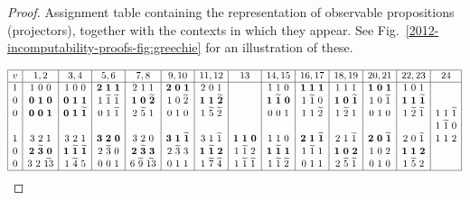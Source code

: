 \documentclass[%
 preprint,
 showpacs,
 showkeys,
 amsmath,
 amssymb,
 aps,
 pra,
 ]{revtex4-1}
\theoremstyle{definition}
\newcommand{\m}[1]{\widetilde{#1}}
\begin{document}
\begin{proof}
	
	\begin{table}
		\caption{Assignment table containing the representation of observable propositions (projectors), together with the contexts in which they appear.
			 See Fig.~\ref{2012-incomputability-proofs-fig:greechie} for an illustration of these.}
		\label{2012-incomputability-proofs-table:greechie}
		\small
		$$\begin{array}{|c|c|c|c|c|c|c|c|c|c|c|c|c|c|}
			\hline
			v & 1, 2        & 3, 4          & 5, 6      & 7, 8       & 9, 10      & 11, 12      & 13        & 14, 15      & 16, 17      & 18, 19      & 20, 21      & 22, 23      & 24      \\
			\hline
			1 & 1~0~0       & 1~0~0         & \bf 2~1~1 & 2~1~1        & \bf 2~0~1   & 2~0~1       &           & 1~1~0       & \bf 1~1~1   & 1~1~1       & \bf 1~0~1   & 1~0~1       &         \\
			0 & \bf 0~1~0   & \bf 0~1~1     & 1~\m1~\m1 & \bf 1~0~\m2  & 1~0~\m2     & \bf 1~1~\m2 &           & \bf 1~\m1~0 & 1~\m1~0     & \bf 1~0~\m1 & 1~0~\m1     & \bf 1~1~\m1 &         \\
			0 & \bf 0~0~1   & \bf 0~1~\m1   & 0~1~\m1   & 2~\m5~1      & 0~1~0       & 1~\m5~\m2   &           & 0~0~1       & 1~1~\m2     & 1~\m2~1     & 0~1~0       & 1~\m2~\m1   & 1~1~\m1 \\
			  &             &               &           &              &             &             &           &             &             &             &             &             & 1~\m1~0 \\
			1 & 3~2~1       & 3~2~1         & \bf 3~2~0 & 3~2~0        & \bf 3~1~\m1 & 3~1~\m1     & \bf 1~1~0 & 1~1~0       & \bf 2~1~\m1 & 2~1~\m1     & \bf 2~0~\m1 & 2~0~\m1     & 1~1~2   \\
			0 & \bf 2~\m3~0 & \bf 1~\m1~\m1 & 2~\m3~0   & \bf 2~\m3~3  & 2~\m3~3     & \bf 1~\m1~2 & 1~\m1~2   & \bf 1~\m1~1 & 1~\m1~1     & \bf 1~0~2   & 1~0~2       & \bf 1~1~2   &         \\
			0 & 3~2~\m{13}  & 1~\m4~5       & 0~0~1     & 6~\m9~\m{13} & 0~1~1       & 1~\m7~\m4   & 1~\m1~\m1 & 1~\m1~\m2   & 0~1~1       & 2~\m5~\m1   & 0~1~0       & 1~\m5~2     &         \\
			\hline
		\end{array}$$
		\normalsize
	\end{table}
	

\end{proof}
\end{document}
